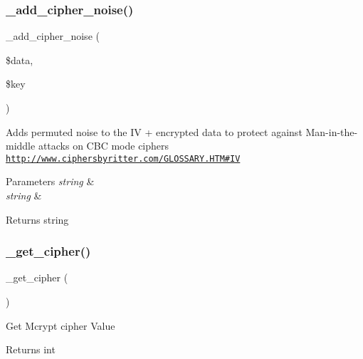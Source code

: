 \subsubsection{\texorpdfstring{\+\_\+add\+\_\+cipher\+\_\+noise()}{\_add\_cipher\_noise()}}
{\footnotesize\ttfamily \+\_\+add\+\_\+cipher\+\_\+noise (\begin{DoxyParamCaption}\item[{}]{\$data,  }\item[{}]{\$key }\end{DoxyParamCaption})\hspace{0.3cm}{\ttfamily [protected]}}

Adds permuted noise to the IV + encrypted data to protect against Man-\/in-\/the-\/middle attacks on C\+BC mode ciphers \href{http://www.ciphersbyritter.com/GLOSSARY.HTM#IV}{\tt http\+://www.\+ciphersbyritter.\+com/\+G\+L\+O\+S\+S\+A\+R\+Y.\+H\+T\+M\#\+IV}


\begin{DoxyParams}{Parameters}
{\em string} & \\
\hline
{\em string} & \\
\hline
\end{DoxyParams}
\begin{DoxyReturn}{Returns}
string 
\end{DoxyReturn}
\mbox{\label{class_c_i___encrypt_a663ee049f0b7596a0e4925a3eb2db062}} 
\subsubsection{\texorpdfstring{\+\_\+get\+\_\+cipher()}{\_get\_cipher()}}
{\footnotesize\ttfamily \+\_\+get\+\_\+cipher (\begin{DoxyParamCaption}{ }\end{DoxyParamCaption})\hspace{0.3cm}{\ttfamily [protected]}}

Get Mcrypt cipher Value

\begin{DoxyReturn}{Returns}
int 
\end{DoxyReturn}
\mbox{\label{class_c_i___encrypt_a8c6526d9458754249ee7268ead883a6c}} 
